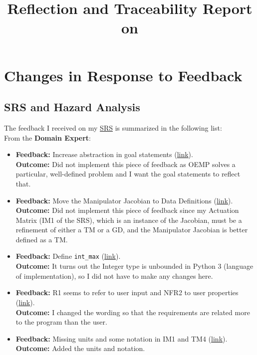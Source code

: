 \documentclass{article}
\title{Reflection and Traceability Report on \progname}
\author{\authname}
\date{}
\begin{document}
\maketitle

\section{Changes in Response to Feedback}
\subsection{SRS and Hazard Analysis}
The feedback I received on my \href{https://github.com/husseinsd1/optimal-em-arrangement/blob/main/docs/SRS/SRS.pdf}{SRS} is summarized in the following list:\\
From the \textbf{Domain Expert}:
\begin{itemize}
    \item \textbf{Feedback: }Increase abstraction in goal statements (\href{https://github.com/husseinsd1/optimal-em-arrangement/issues/4}{link}).  \\
          \textbf{Outcome: }Did not implement this piece of feedback as OEMP solves a particular, well-defined problem and I want the goal statements to reflect that. 
    \item \textbf{Feedback: }Move the Manipulator Jacobian to Data Definitions (\href{https://github.com/husseinsd1/optimal-em-arrangement/issues/5}{link}).  \\
          \textbf{Outcome: }Did not implement this piece of feedback since my Actuation Matrix (IM1 of the SRS), which is an instance of the Jacobian, must be a refinement of either a TM or a GD, and the Manipulator Jacobian is better defined as a TM. 
    \item \textbf{Feedback: }Define \texttt{int\_max} (\href{https://github.com/husseinsd1/optimal-em-arrangement/issues/6}{link}).  \\
          \textbf{Outcome: }It turns out the Integer type is unbounded in Python 3 (language of implementation), so I did not have to make any changes here. 
    \item \textbf{Feedback: }R1 seems to refer to user input and NFR2 to user properties (\href{https://github.com/husseinsd1/optimal-em-arrangement/issues/7}{link}).  \\
          \textbf{Outcome: }I changed the wording so that the requirements are related more to the program than the user. 
    \item \textbf{Feedback: }Missing units and some notation in IM1 and TM4 (\href{https://github.com/husseinsd1/optimal-em-arrangement/issues/10}{link}).  \\
          \textbf{Outcome: }Added the units and notation. 
\end{itemize} 
\end{document}
